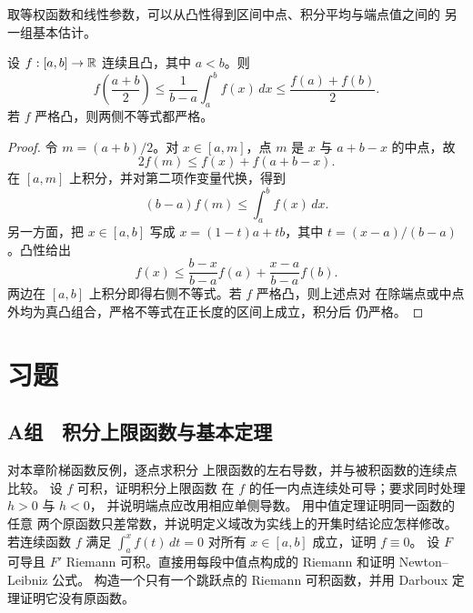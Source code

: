 取等权函数和线性参数，可以从凸性得到区间中点、积分平均与端点值之间的
另一组基本估计。

\begin{theorem}
\label{thm:hermite-hadamard}
设 \(f:[a,b]\to\mathbb{R}\) 连续且凸，其中 \(a<b\)。则
\begin{equation}
 f\!\left(\frac{a+b}{2}\right)
 \le \frac1{b-a}\int_a^b f(x)\,dx
 \le \frac{f(a)+f(b)}2.
 \label{eq:hermite-hadamard}
\end{equation}
若 \(f\) 严格凸，则两侧不等式都严格。
\end{theorem}

\begin{proof}
令 \(m=(a+b)/2\)。对 \(x\in[a,m]\)，点 \(m\) 是 \(x\) 与
\(a+b-x\) 的中点，故
\[
 2f(m)\le f(x)+f(a+b-x).
\]
在 \([a,m]\) 上积分，并对第二项作变量代换，得到
\[
 (b-a)f(m)\le\int_a^b f(x)\,dx.
\]
另一方面，把 \(x\in[a,b]\) 写成
\(x=(1-t)a+tb\)，其中 \(t=(x-a)/(b-a)\)。凸性给出
\[
 f(x)\le\frac{b-x}{b-a}f(a)+\frac{x-a}{b-a}f(b).
\]
两边在 \([a,b]\) 上积分即得右侧不等式。若 \(f\) 严格凸，则上述点对
在除端点或中点外均为真凸组合，严格不等式在正长度的区间上成立，积分后
仍严格。
\end{proof}

\section*{习题}

\subsection*{A组　积分上限函数与基本定理}
\begin{enumerate}[label=\textbf{\thechapter.\arabic*.}]
  对本章阶梯函数反例，逐点求积分
 上限函数的左右导数，并与被积函数的连续点比较。
  设 \(f\) 可积，证明积分上限函数
 在 \(f\) 的任一内点连续处可导；要求同时处理 \(h>0\) 与 \(h<0\)，
 并说明端点应改用相应单侧导数。
  用中值定理证明同一函数的任意
 两个原函数只差常数，并说明定义域改为实线上的开集时结论应怎样修改。
  若连续函数 \(f\) 满足
 \(\int_a^x f(t)\,dt=0\) 对所有 \(x\in[a,b]\) 成立，证明 \(f\equiv0\)。
  设 \(F\) 可导且 \(F'\) Riemann
 可积。直接用每段中值点构成的 Riemann 和证明 Newton--Leibniz 公式。
  构造一个只有一个跳跃点的
 Riemann 可积函数，并用 Darboux 定理证明它没有原函数。
\end{enumerate}

